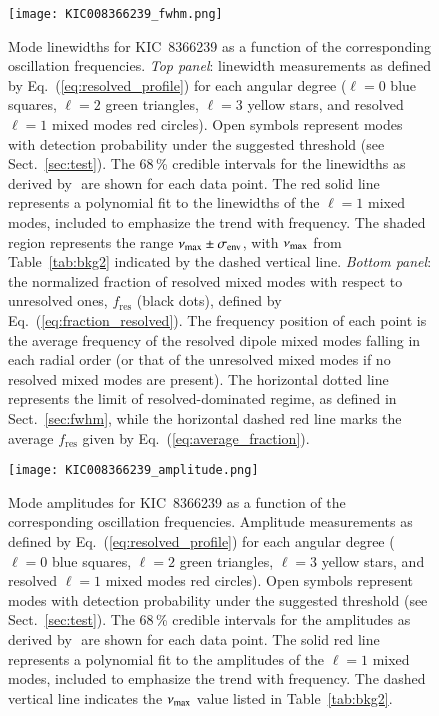 \begin{figure}
   \centering
   \texttt{[image: KIC008366239\_fwhm.png]}
      \caption{Mode linewidths for KIC~8366239 as a function of the corresponding oscillation frequencies. \textit{Top panel}: linewidth measurements as defined by Eq.~(\ref{eq:resolved_profile}) for each angular degree ($\ell = 0$ blue squares, $\ell = 2$ green triangles, $\ell = 3$ yellow stars, and resolved $\ell = 1$ mixed modes red circles). Open symbols represent modes with detection probability under the suggested threshold (see Sect.~\ref{sec:test}). The 68\,\% credible intervals for the linewidths as derived by \diamonds\,\,are shown for each data point. The red solid line represents a polynomial fit to the linewidths of the $\ell = 1$ mixed modes, included to emphasize the trend with frequency. The shaded region represents the range $\nu_\mathrm{max} \pm \sigma_\mathrm{env}$, with $\nu_\mathrm{max}$ from Table~\ref{tab:bkg2} indicated by the dashed vertical line. \textit{Bottom panel}: the normalized fraction of resolved mixed modes with respect to unresolved ones, $f_\mathrm{res}$ (black dots), defined by Eq.~(\ref{eq:fraction_resolved}). The frequency position of each point is the average frequency of the resolved dipole mixed modes falling in each radial order (or that of the unresolved mixed modes if no resolved mixed modes are present). The horizontal dotted line represents the limit of resolved-dominated regime, as defined in Sect.~\ref{sec:fwhm}, while the horizontal dashed red line marks the average $f_\mathrm{res}$ given by Eq.~(\ref{eq:average_fraction}).}
    \label{fig:8366239fwhm}
\end{figure}

\begin{figure}
   \centering
   \texttt{[image: KIC008366239\_amplitude.png]}
      \caption{Mode amplitudes for KIC~8366239 as a function of the corresponding oscillation frequencies. Amplitude measurements as defined by Eq.~(\ref{eq:resolved_profile}) for each angular degree ($\ell = 0$ blue squares, $\ell = 2$ green triangles, $\ell = 3$ yellow stars, and resolved $\ell = 1$ mixed modes red circles). Open symbols represent modes with detection probability under the suggested threshold (see Sect.~\ref{sec:test}). The 68\,\% credible intervals for the amplitudes as derived by \diamonds\,\,are shown for each data point. The solid red line represents a polynomial fit to the amplitudes of the $\ell = 1$ mixed modes, included to emphasize the trend with frequency. The dashed vertical line indicates the $\nu_\mathrm{max}$ value listed in Table~\ref{tab:bkg2}.}
    \label{fig:8366239amplitude}
\end{figure}
\clearpage


